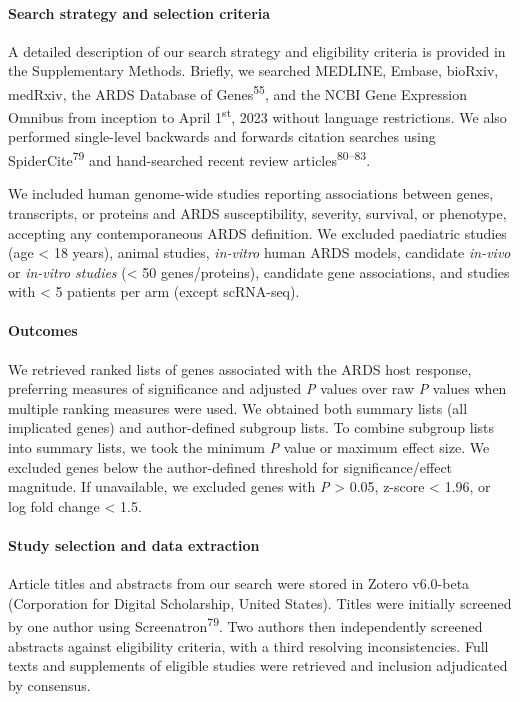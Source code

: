 \documentclass[
  11,
  a4paper,
]{article}
\let\oldparagraph\paragraph
\renewcommand{\paragraph}[1]{\oldparagraph{#1}\mbox{}}
\begin{document}
\paragraph{Search strategy and selection
criteria}\label{search-strategy-and-selection-criteria}

A detailed description of our search strategy and eligibility criteria
is provided in the Supplementary Methods. Briefly, we searched MEDLINE,
Embase, bioRxiv, medRxiv, the ARDS Database of
Genes\textsuperscript{55}, and the NCBI Gene Expression Omnibus from
inception to April 1\textsuperscript{st}, 2023 without language
restrictions. We also performed single-level backwards and forwards
citation searches using SpiderCite\textsuperscript{79} and hand-searched
recent review articles\textsuperscript{80--83}.

We included human genome-wide studies reporting associations between
genes, transcripts, or proteins and ARDS susceptibility, severity,
survival, or phenotype, accepting any contemporaneous ARDS definition.
We excluded paediatric studies (age \textless{} 18 years), animal
studies, \emph{in-vitro} human ARDS models, candidate \emph{in-vivo} or
\emph{in-vitro studies} (\textless{} 50 genes/proteins), candidate gene
associations, and studies with \textless{} 5 patients per arm (except
scRNA-seq).

\paragraph{Outcomes}\label{outcomes}

We retrieved ranked lists of genes associated with the ARDS host
response, preferring measures of significance and adjusted \emph{P}
values over raw \emph{P} values when multiple ranking measures were
used. We obtained both summary lists (all implicated genes) and
author-defined subgroup lists. To combine subgroup lists into summary
lists, we took the minimum \emph{P} value or maximum effect size. We
excluded genes below the author-defined threshold for
significance/effect magnitude. If unavailable, we excluded genes with
\emph{P} \textgreater{} 0.05, z-score \textless{} 1.96, or log fold
change \textless{} 1.5.

\paragraph{Study selection and data
extraction}\label{study-selection-and-data-extraction}

Article titles and abstracts from our search were stored in Zotero
v6.0-beta (Corporation for Digital Scholarship, United States). Titles
were initially screened by one author using
Screenatron\textsuperscript{79}. Two authors then independently screened
abstracts against eligibility criteria, with a third resolving
inconsistencies. Full texts and supplements of eligible studies were
retrieved and inclusion adjudicated by consensus.
\end{document}

